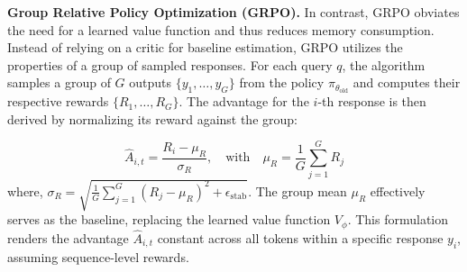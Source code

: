 \begin{hide}
\textbf{Group Relative Policy Optimization (GRPO).} In contrast, GRPO obviates the need for a learned value function and thus reduces memory consumption. Instead of relying on a critic for baseline estimation, GRPO utilizes the properties of a group of sampled responses. For each query $q$, the algorithm samples a group of $G$ outputs $\{y_1, \dots, y_G\}$ from the policy $\pi_{\theta_{\text{old}}}$ and computes their respective rewards $\{R_1, \dots, R_G\}$. The advantage for the $i$-th response is then derived by normalizing its reward against the group:

\begin{equation*}
\hat{A}_{i,t} = \frac{R_i - \mu_R}{\sigma_R}, \quad \text{with} \quad \mu_R = \frac{1}{G}\sum_{j=1}^G R_j
\end{equation*}
where, $\sigma_R = \sqrt{\frac{1}{G}\sum_{j=1}^G (R_j - \mu_R)^2 + \epsilon_{\text{stab}}}$. The group mean $\mu_R$ effectively serves as the baseline, replacing the learned value function $V_\phi$. This formulation renders the advantage $\hat{A}_{i,t}$ constant across all tokens within a specific response $y_i$, assuming sequence-level rewards. 

\end{hide}
